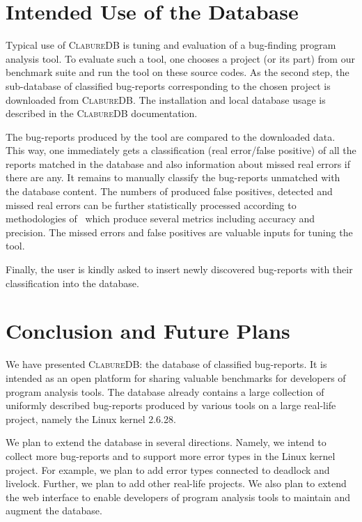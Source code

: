 \documentclass[10pt]{llncs}
\newcommand\cdb{\textsc{ClabureDB}\xspace}
\begin{document}

\section{Intended Use of the Database}\label{sec:use}

Typical use of \cdb is tuning and evaluation of a bug-finding program
analysis tool. To evaluate such a tool, one chooses a project (or its part)
from our benchmark suite and run the tool on these source codes.  As the
second step, the sub-database of classified bug-reports corresponding to the
chosen project is downloaded from \cdb.  The installation and local database
usage is described in the \cdb documentation.

The bug-reports produced by the tool are compared to the downloaded data. This
way, one immediately gets a classification (real error/false positive) of all
the reports matched in the database and also information about missed real
errors if there are any. It remains to manually classify the bug-reports
unmatched with the database content. The numbers of produced false positives,
detected and missed real errors can be further statistically processed
according to methodologies of~\cite{CHK09,HW08} which produce several metrics
including accuracy and precision. The missed errors and false positives are
valuable inputs for tuning the tool. 

Finally, the user is kindly asked to insert newly discovered bug-reports with
their classification into the database.  


\section{Conclusion and Future Plans}

We have presented \cdb: the database of classified bug-reports. It is
intended as an open platform for sharing valuable benchmarks for developers
of program analysis tools. The database already contains a large collection
of uniformly described bug-reports produced by various tools on a large
real-life project, namely the Linux kernel 2.6.28.

\medskip
We plan to extend the database in several directions. Namely, we intend to
collect more bug-reports and to support more error types in the Linux kernel
project. For example, we plan to add error types connected to deadlock and
livelock. 
Further, we plan to add other real-life projects. We also plan to extend the
web interface to enable developers of program analysis tools to maintain and
augment the database.
\end{document}
